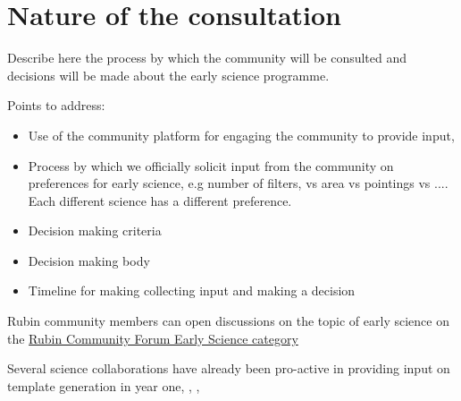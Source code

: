 
\section{Nature of the consultation}

Describe here the process by which the community will be consulted and decisions will be made about the early science programme. 

Points to address:
\begin{itemize}
\item Use of the community platform for engaging the community to provide input,
\item Process by which we officially solicit  input from the community on preferences for early science, e.g number of filters, vs area vs pointings vs .... Each different science has a different preference. 
\item Decision making criteria 
\item Decision making body
\item Timeline for making collecting input and making a decision
\end{itemize}

Rubin community members can open discussions on the topic of early science on the \href{https://community.lsst.org/t/about-the-early-science-category/5775}{Rubin Community Forum Early Science category}

Several science collaborations have already been pro-active in providing input on template generation in year one, , , 
